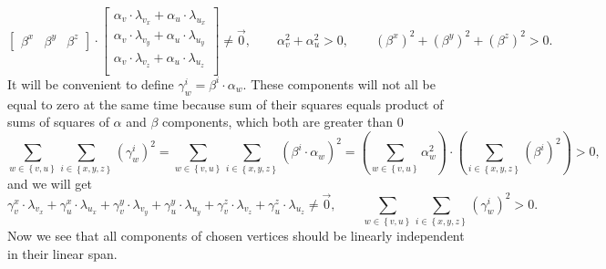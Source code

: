 \begin{equation*}
  \begin{bmatrix}
    \beta^x & \beta^y & \beta^z
  \end{bmatrix}
  \cdot \begin{bmatrix}
    \alpha_v \cdot \lambda_{v_x} + \alpha_u \cdot \lambda_{u_x} \\
    \alpha_v \cdot \lambda_{v_y} + \alpha_u \cdot \lambda_{u_y} \\
    \alpha_v \cdot \lambda_{v_z} + \alpha_u \cdot \lambda_{u_z} \\
  \end{bmatrix}
  \neq \vec{0},
  \qquad \alpha_v^2 + \alpha_u^2 > 0,
  \qquad \left( \beta^x \right)^2
    + \left( \beta^y \right)^2
    + \left( \beta^z \right)^2 > 0.
\end{equation*}
It will be convenient to define $\gamma_w^i = \beta^i \cdot \alpha_w$.
These components will not all be equal to zero at the same time because
sum of their squares equals product of sums of squares
of $\alpha$ and $\beta$ components, which both are greater than $0$
\begin{equation*}
  \sum_{w \in \left\{ v, u \right\}}
  \sum_{i \in \left\{ x, y, z \right\}}
    \left( \gamma_w^i \right)^2
  =
  \sum_{w \in \left\{ v, u \right\}}
  \sum_{i \in \left\{ x, y, z \right\}}
    \left( \beta^i \cdot \alpha_w \right)^2
  =
  \left( \sum_{w \in \left\{ v, u \right\}} \alpha_w^2 \right)
  \cdot
  \left( \sum_{i \in \left\{ x, y, z \right\}} \left( \beta^i \right)^2 \right)
  > 0,
\end{equation*}
and we will get
\begin{equation*}
  \gamma_v^x \cdot \lambda_{v_x}
  + \gamma_u^x \cdot \lambda_{u_x}
  + \gamma_v^y \cdot \lambda_{v_y}
  + \gamma_u^y \cdot \lambda_{u_y}
  + \gamma_v^z \cdot \lambda_{v_z}
  + \gamma_u^z \cdot \lambda_{u_z}
  \neq \vec{0},
  \qquad
    \sum_{w \in \left\{ v, u \right\}}
    \sum_{i \in \left\{ x, y, z \right\}}
      \left( \gamma_w^i \right)^2 > 0.
\end{equation*}
Now we see that all components of chosen vertices
should be linearly independent in their linear span.
